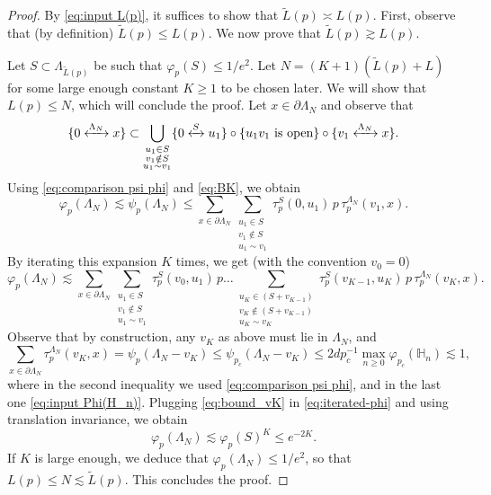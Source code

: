 \documentclass[10pt,a4paper]{amsart}
\def \p {{\partial}}
\newcommand{\connect}{\xleftrightarrow}
\begin{document}
\begin{proof} By \eqref{eq:input L(p)}, it suffices to show that $\tilde{L}(p)\asymp L(p)$. First, observe that (by definition) $\tilde L(p) \leq L(p)$. 
We now prove that $\tilde{L}(p)\gtrsim L(p)$. 

Let $S\subset \Lambda_{\tilde{L}(p)}$ be such that $\varphi_p(S)\leq 1/e^2$. Let $N= (K+1) (\tilde{L}(p)+L)$ for some large enough constant $K\geq 1$ to be chosen later. We will show that $L(p)\leq N$, which will conclude the proof. 
Let $x\in \partial \Lambda_N$ and observe that
\begin{equation}
\{0\connect{\Lambda_N\:} x\} \subset \bigcup_{\substack{u_1\in S\\ v_1\notin S\\ u_1\sim v_1}} \{0\connect{S\:} u_1\} \circ \{u_1v_1 \text{ is open}\} \circ \{v_1 \connect{\Lambda_N\:} x\}.
\end{equation}
 Using \eqref{eq:comparison psi phi} and \eqref{eq:BK}, we obtain 
\begin{equation}
\varphi_p(\Lambda_N)\lesssim  \psi_p(\Lambda_N) \leq \sum_{x\in\partial\Lambda_N}  \sum_{\substack{u_1\in S\\ v_1\notin S \\ u_1\sim v_1}} \tau_p^S(0,u_1)\,p\,  \tau_p^{\Lambda_N}(v_1,x).
\end{equation}
By iterating this expansion $K$ times, we get (with the convention $v_0=0$)
\begin{equation}\label{eq:iterated-phi}
	\varphi_p(\Lambda_N)\lesssim  \sum_{x\in\partial\Lambda_N}  
	\sum_{\substack{u_1\in S\\ v_1\notin S \\ u_1\sim v_1}} \tau_p^S(v_0,u_1)\,p
	\ldots\sum_{\substack{u_{K}\in (S+v_{K-1})\\ v_{K}\notin (S+v_{K-1}) \\ u_K\sim v_K}} \tau_p^S(v_{K-1},u_K)\,p\, \tau_p^{\Lambda_N}(v_K,x).\end{equation}
Observe that by construction, any $v_K$ as above must lie in $\Lambda_N$, and 
\begin{equation}\label{eq:bound_vK}
\sum_{x\in  \p \Lambda_N} \tau_p^{\Lambda_N}(v_K,x)=\psi_{p}(\Lambda_N-v_K)\leq \psi_{p_c}(\Lambda_N-v_K)   
\leq 2dp_c^{-1} \max_{n\geq 0}\varphi_{p_c}(\mathbb H_n)\lesssim 1,
\end{equation}
where in the second inequality we used \eqref{eq:comparison psi phi}, and in the last one \eqref{eq:input Phi(H_n)}. Plugging \eqref{eq:bound_vK} in \eqref{eq:iterated-phi} and using translation invariance, we obtain
\begin{equation}\label{}
\varphi_p(\Lambda_N)  \lesssim  \varphi_p(S)^K \leq e^{-2K}.
\end{equation}
If $K$ is large enough, we deduce that $\varphi_p(\Lambda_N)\leq 1/e^2$, so that $L(p)\leq N\lesssim \tilde{L}(p)$. This concludes the proof.
\end{proof}
\end{document}
